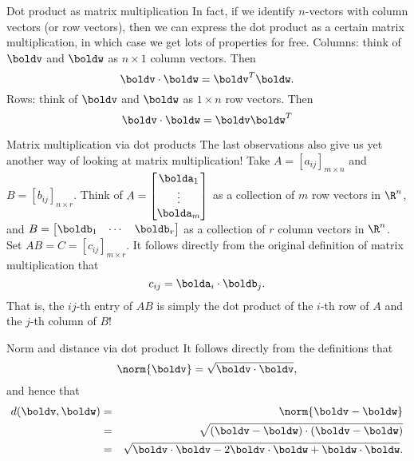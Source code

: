 \begin{frame}{Dot product as matrix multiplication}
In fact, if we identify $n$-vectors with column vectors (or row vectors), then we can express the dot product as a certain matrix multiplication, in which case we get lots of properties for free. 
\bpause
\alert{Columns:} think of $\boldv$ and $\boldw$ as $n\times 1$ column vectors. Then 
\[
\boldv\cdot\boldw=\boldv^T\boldw.
\]
\bpause
\alert{Rows:} think of $\boldv$ and $\boldw$ as $1\times n$ row vectors. Then 
\[
\boldv\cdot\boldw=\boldv\boldw^T
\]
\end{frame}
\begin{frame}{Matrix multiplication via dot products}
The last observations also give us yet another way of looking at matrix multiplication! 
\bspace
Take $A=[a_{ij}]_{m\times n}$ and $B=[b_{ij}]_{n\times r}$. Think of $A=\begin{bmatrix} \bolda_1\\ \vdots \\ \bolda_m\end{bmatrix}$ as a collection of $m$ row vectors in $\R^n$, and $B=\begin{bmatrix}\boldb_1&\cdots &\boldb_r \end{bmatrix}$ as a collection of $r$ column vectors in $\R^n$. 
\bpause 
Set $AB=C=[c_{ij}]_{m\times r}$. It follows directly from the original definition of matrix multiplication that 
\[
c_{ij}=\bolda_i\cdot\boldb_j.
\] 
That is, the $ij$-th entry of $AB$ is simply the dot product of the $i$-th row of $A$ and the $j$-th column of $B$!
\end{frame}
\begin{frame}{Norm and distance via dot product}
It follows directly from the definitions that 
\[
\norm{\boldv}=\sqrt{\boldv\cdot\boldv},
\]
and hence that 
\begin{eqnarray*}
d(\boldv,\boldw)&=&\norm{\boldv-\boldw}\\
&=&\sqrt{(\boldv-\boldw)\cdot (\boldv-\boldw)}\\
&=&\sqrt{\boldv\cdot \boldv-2\boldv\cdot\boldw+\boldw\cdot\boldw}.
\end{eqnarray*}
\end{frame}

